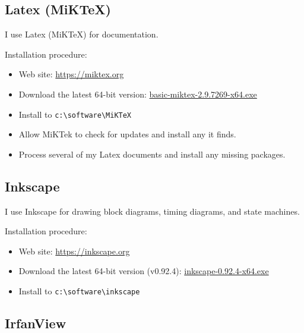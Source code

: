 \documentclass[10pt,twoside]{article}
\begin{document}
\clearpage
\subsection{Latex (MiKTeX)}

I use Latex (MiKTeX) for documentation.

\vskip5mm
\noindent Installation procedure:
%
\begin{itemize}
\item Web site: \href{https://miktex.org}{https://miktex.org}
\item Download the latest 64-bit version:
\href{https://miktex.org/download/ctan/systems/win32/miktex/setup/windows-x64/basic-miktex-2.9.7269-x64.exe}{basic-miktex-2.9.7269-x64.exe}
\item Install to \verb+c:\software\MiKTeX+
\item Allow MiKTek to check for updates and install any it finds.
\item Process several of my Latex documents and install any missing packages.
\end{itemize}


\subsection{Inkscape}

I use Inkscape for drawing block diagrams, timing diagrams, and state machines.

\vskip5mm
\noindent Installation procedure:
%
\begin{itemize}
\item Web site: \href{https://inkscape.org}{https://inkscape.org}
\item Download the latest 64-bit version (v0.92.4):
\href{https://inkscape.org/gallery/item/13318/inkscape-0.92.4-x64.exe}{inkscape-0.92.4-x64.exe}
\item Install to \verb+c:\software\inkscape+
\end{itemize}

\subsection{IrfanView}
\end{document}
